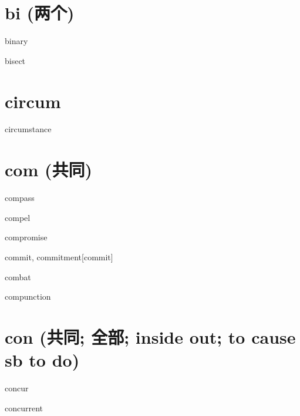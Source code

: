 \section{bi (两个)}

\begin{RefWord}{binary}
\end{RefWord}

\begin{RefWord}{bisect}
\end{RefWord}



\section{circum}

\begin{RefWord}{circumstance}
\end{RefWord}

\section{com (共同)}

\begin{RefWord}{compass}
\end{RefWord}

\begin{RefWord}{compel}
\end{RefWord}

\begin{RefWord}{compromise}
\end{RefWord}

\begin{RefWord}{commit, commitment}[commit]
\end{RefWord}

\begin{RefWord}{combat}
\end{RefWord}

\begin{RefWord}{compunction}
\end{RefWord}

\section{con (共同; 全部; inside out; to cause sb to do)}
\begin{RefWord}{concur}
\end{RefWord}

\begin{RefWord}{concurrent}
\end{RefWord}

